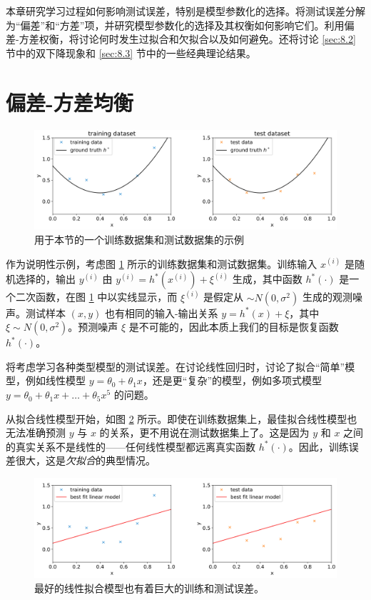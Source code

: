 本章研究学习过程如何影响测试误差，特别是模型参数化的选择。将测试误差分解为“偏差”和“方差”项，并研究模型参数化的选择及其权衡如何影响它们。利用偏差-方差权衡，将讨论何时发生过拟合和欠拟合以及如何避免。还将讨论 \ref{sec:8.2} 节中的双下降现象和 \ref{sec:8.3} 节中的一些经典理论结果。


\section{偏差-方差均衡}\label{sec:8.1}

\begin{figure}[H]
    \centering
    \includegraphics[width=0.8\linewidth]{figs/fitting_gt.png}
    \caption{用于本节的一个训练数据集和测试数据集的示例}
    \label{fig:8.1}
\end{figure}

作为说明性示例，考虑图 \ref{fig:8.1} 所示的训练数据集和测试数据集。训练输入 $x^{(i)}$ 是随机选择的，输出 $y^{(i)}$ 由 $y^{(i)} = h^*(x^{(i)}) + \xi^{(i)}$ 生成，其中函数 $h^*(\cdot)$ 是一个二次函数，在图 \ref{fig:8.1} 中以实线显示，而 $\xi^{(i)}$ 是假定从 $\sim N(0, \sigma^2)$ 生成的观测噪声。测试样本 $(x, y)$ 也有相同的输入-输出关系 $y = h^*(x) + \xi$，其中 $\xi \sim N(0, \sigma^2)$。预测噪声 $\xi$ 是不可能的，因此本质上我们的目标是恢复函数 $h^*(\cdot)$。

将考虑学习各种类型模型的测试误差。在讨论线性回归时，讨论了拟合“简单”模型，例如线性模型 $y = \theta_0 + \theta_1 x$，还是更“复杂”的模型，例如多项式模型 $y = \theta_0 + \theta_1 x + \dots + \theta_5 x^5$ 的问题。

从拟合线性模型开始，如图 \ref{fig:8.2} 所示。即使在训练数据集上，最佳拟合线性模型也无法准确预测 $y$ 与 $x$ 的关系，更不用说在测试数据集上了。这是因为 $y$ 和 $x$ 之间的真实关系不是线性的——任何线性模型都远离真实函数 $h^*(\cdot)$。因此，训练误差很大，这是\textit{欠拟合}的典型情况。

\begin{figure}[H]
    \centering
    \includegraphics[width=0.8\linewidth]{figs/fitting_linear.png}
    \caption{最好的线性拟合模型也有着巨大的训练和测试误差。}
    \label{fig:8.2}
\end{figure}


